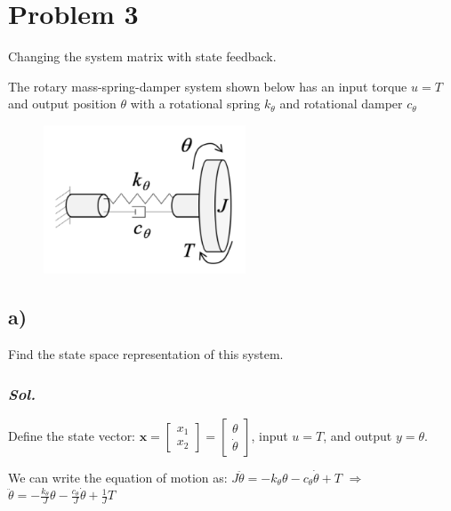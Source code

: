 \section{Problem 3}
Changing the system matrix with state feedback.

The rotary mass-spring-damper system shown below has an input torque $u = T$ and
output position $\theta$ with a rotational spring $k_{\theta}$ and rotational damper $c_{\theta}$

\begin{figure}[htp]
    \centering
    \includegraphics[width=6cm]{images/Q3.png}
\end{figure}

\subsection{a)}
Find the state space representation of this system.
\subsubsection{\textit{ Sol. }}

Define the state vector: $\textbf{x} = 
\begin{bmatrix}
    x_1\\
    x_2
\end{bmatrix} = 
\begin{bmatrix}
    \theta\\
    \dot{\theta}
\end{bmatrix}$, input $u = T$, and output $y = \theta$.

We can write the equation of motion as: $J\ddot{\theta} = - k_{\theta}\theta - c_{\theta}\dot{\theta} + T$ $\Rightarrow $   $\ddot{\theta} = - \frac{k_{\theta}}{J}\theta - \frac{c_{\theta}}{J}\dot{\theta} + \frac{1}{J}T$

